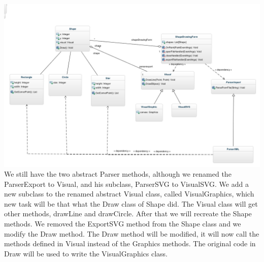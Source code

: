 \documentclass[a4paper,12pt]{article}
\begin{document}
\\
\includegraphics[scale=0.3]{diagramFinal.jpg}
\\

We still have the two abstract Parser methods, although we renamed the ParserExport to Visual, and his subclass, ParserSVG to VisualSVG. We add a new subclass to the renamed abstract Visual class, called VisualGraphics, which new task will be that what the Draw class of Shape did. The Visual class will get other methods, drawLine and drawCircle. After that we will recreate the Shape methods. We removed the ExportSVG method from the Shape class and we modify the Draw method. The Draw method will be modified, it will now call the methods defined in Visual instead of the Graphics methods. The original code in Draw will be used to write the VisualGraphics class.
\\

\end{document}
